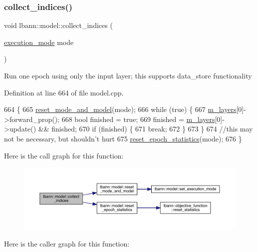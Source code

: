 \subsubsection{\texorpdfstring{collect\+\_\+indices()}{collect\_indices()}}
{\footnotesize\ttfamily void lbann\+::model\+::collect\+\_\+indices (\begin{DoxyParamCaption}\item[{\hyperlink{base_8hpp_a2781a159088df64ed7d47cc91c4dc0a8}{execution\+\_\+mode}}]{mode }\end{DoxyParamCaption})}

Run one epoch using only the input layer; this supports data\+\_\+store functionality 

Definition at line 664 of file model.\+cpp.


\begin{DoxyCode}
664                                                \{
665   \hyperlink{classlbann_1_1model_a5d188d75f53e0a4c6161500181b27c03}{reset\_mode\_and\_model}(mode);
666   \textcolor{keywordflow}{while} (\textcolor{keyword}{true}) \{
667     \hyperlink{classlbann_1_1model_a0229fc226ec163d1411548446104569d}{m\_layers}[0]->forward\_prop();
668     \textcolor{keywordtype}{bool} finished = \textcolor{keyword}{true};
669     finished = \hyperlink{classlbann_1_1model_a0229fc226ec163d1411548446104569d}{m\_layers}[0]->update() && finished;
670     \textcolor{keywordflow}{if} (finished) \{
671       \textcolor{keywordflow}{break};
672     \}
673   \}
674   \textcolor{comment}{//this may not be necessary, but shouldn't hurt}
675   \hyperlink{classlbann_1_1model_a9c6e9c199ca0ae06b8cf7266971ab9c3}{reset\_epoch\_statistics}(mode);
676 \}
\end{DoxyCode}
Here is the call graph for this function\+:\nopagebreak
\begin{figure}[H]
\begin{center}
\leavevmode
\includegraphics[width=350pt]{classlbann_1_1model_aa819e0d7c8bb178155e40e33037cf054_cgraph}
\end{center}
\end{figure}
Here is the caller graph for this function\+:\nopagebreak
